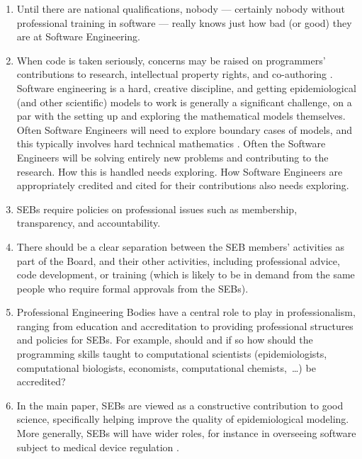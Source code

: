 \documentclass[10pt,a4paper]{article}
\begin{document}
\begin{enumerate}\raggedright
\item 
Until there are national qualifications, nobody --- certainly nobody without professional training in software --- really knows just how bad (or good) they are at Software Engineering.

\item
When code is taken seriously, concerns may be raised on programmers' contributions to research, intellectual property rights, and co-authoring \cite{vancouver}. Software engineering is a hard, creative discipline, and getting epidemiological (and other scientific) models to work is generally a significant challenge, on a par with the setting up and exploring the mathematical models themselves. Often Software Engineers will need to explore boundary cases of models, and this typically involves hard technical mathematics \cite{hamming}. Often the Software Engineers will be solving entirely new problems and contributing to the research. How this is handled needs exploring. How Software Engineers are appropriately credited and cited for their contributions also needs exploring.

\item 
SEBs require policies on professional issues such as membership, transparency, and accountability.
 
\item
There should be a clear separation between the SEB members' activities as part of the Board, and their other activities, including professional advice, code development, or training (which is likely to be in demand from the same people who require formal approvals from the SEBs).

\item
Professional Engineering Bodies have a central role to play in professionalism, ranging from education and accreditation to providing professional structures and policies for SEBs. For example, should and if so how should the programming skills taught to computational scientists (epidemiologists, computational biologists, economists, computational chemists,~\ldots\@) be accredited?

\item
In the main paper, SEBs are viewed as a constructive contribution to good science, specifically helping improve the quality of epidemiological modeling. More generally, SEBs will have wider roles, for instance in overseeing software subject to medical device regulation \cite{fixit}.


\end{enumerate}
\end{document}
